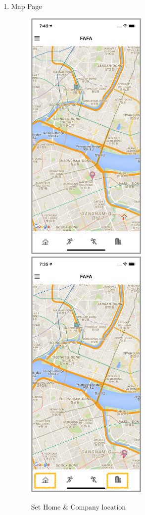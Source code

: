 \documentclass[conference]{IEEEtran}
\begin{document}
\begin{enumerate}
    \item Map Page\\
    \begin{figure}[htbp]
    \centering
    \hfill
    \includegraphics{images/f11.png}
    \hfill
    \includegraphics{images/f11-2.png}
    \caption{Set Home \& Company location}
    \end{figure}
    

\end{enumerate}
\end{document}
